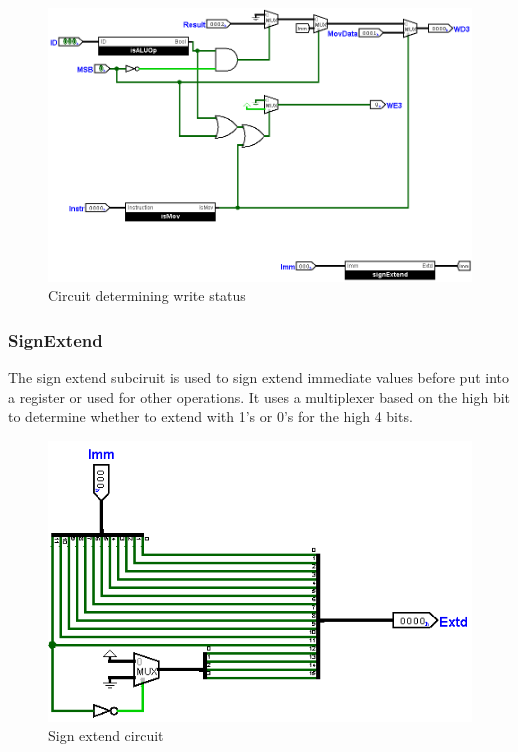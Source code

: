\documentclass[12pt, letter]{article}
\begin{document}
	\begin{figure}[h]
		\centering
		\includegraphics[scale = 0.3]{WInput}
		\caption{Circuit determining write status}
		\label{fig:WInput}
	\end{figure}

	\subsubsection{SignExtend}
	The sign extend subciruit is used to sign extend immediate values before put into a register or used for other operations. It uses a multiplexer based on the high bit to determine whether to extend with 1's or 0's for the high 4 bits.
	
	\begin{figure}[h]
		\centering
		\includegraphics[scale = 0.35]{SignExtend}
		\caption{Sign extend circuit}
		\label{fig:SignExtend}
	\end{figure}
\end{document}
